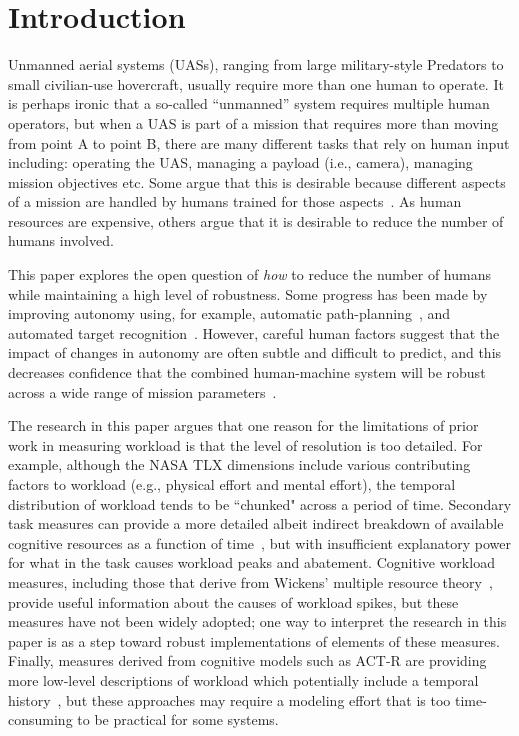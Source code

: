 \noindent
\section{Introduction}

Unmanned aerial systems (UASs), ranging from large military-style Predators to small civilian-use hovercraft, usually require more than one human to operate.  It is perhaps ironic that a so-called ``unmanned'' system requires multiple human operators, but when a UAS is part of a mission that requires more than moving from point A to point B, there are many different tasks that rely on human input including: operating the UAS, managing a payload (i.e., camera), managing mission objectives etc.  Some argue that this is desirable because different aspects of a mission are handled by humans trained for those aspects~\cite{MurphyBurke2010}. As human resources are expensive, others argue that it is desirable to reduce the number of humans involved.

This paper explores the open question of {\em how} to reduce the number of humans while maintaining a high level of robustness.  Some progress has been made by improving autonomy using, for example, automatic path-planning~\cite{WongBourgaultFurukawa2005,878915,pettersson2006probabilistic,QuigleyBarberEtAl2005,NelsonBarberMcLainBeard2006}, and automated target recognition~\cite{MorseEnghGoodrich2010,dasgupta2008multiagent,barber2006vision}. However, careful human factors suggest that the impact of changes in autonomy are often subtle and difficult to predict, and this decreases confidence that the combined human-machine system will be robust across a wide range of mission parameters~\cite{KaberEndsley2004,chen2011supervisory,chen2007human}.

The research in this paper argues that one reason for the limitations of prior work in measuring workload is that the level of resolution is too detailed.  For example, although the NASA TLX dimensions include various contributing factors to workload (e.g., physical effort and mental effort), the temporal distribution of workload tends to be ``chunked" across a period of time.  Secondary task measures can provide a more detailed albeit indirect breakdown of available cognitive resources as a function of time~\cite{kaber1999adaptive}, but with insufficient explanatory power for what in the task causes workload peaks and abatement.  Cognitive workload measures, including those that derive from Wickens' multiple resource theory~\cite{wickens2002multiple}, provide useful information about the causes of workload spikes, but these measures have not been widely adopted; one way to interpret the research in this paper is as a step toward robust implementations of elements of these measures.  Finally, measures derived from cognitive models such as ACT-R are providing more low-level descriptions of workload which potentially include a temporal history~\cite{lebiere2013cognitive}, but these approaches may require a modeling effort that is too time-consuming to be practical for some systems.


